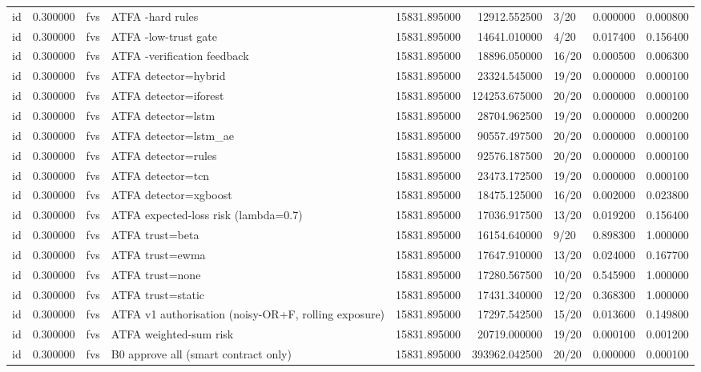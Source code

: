 \begin{tabular}{lrllrrlrr}
id & 0.300000 & fvs & ATFA -hard rules & 15831.895000 & 12912.552500 & 3/20 & 0.000000 & 0.000800 \\
id & 0.300000 & fvs & ATFA -low-trust gate & 15831.895000 & 14641.010000 & 4/20 & 0.017400 & 0.156400 \\
id & 0.300000 & fvs & ATFA -verification feedback & 15831.895000 & 18896.050000 & 16/20 & 0.000500 & 0.006300 \\
id & 0.300000 & fvs & ATFA detector=hybrid & 15831.895000 & 23324.545000 & 19/20 & 0.000000 & 0.000100 \\
id & 0.300000 & fvs & ATFA detector=iforest & 15831.895000 & 124253.675000 & 20/20 & 0.000000 & 0.000100 \\
id & 0.300000 & fvs & ATFA detector=lstm & 15831.895000 & 28704.962500 & 19/20 & 0.000000 & 0.000200 \\
id & 0.300000 & fvs & ATFA detector=lstm\_ae & 15831.895000 & 90557.497500 & 20/20 & 0.000000 & 0.000100 \\
id & 0.300000 & fvs & ATFA detector=rules & 15831.895000 & 92576.187500 & 20/20 & 0.000000 & 0.000100 \\
id & 0.300000 & fvs & ATFA detector=tcn & 15831.895000 & 23473.172500 & 19/20 & 0.000000 & 0.000100 \\
id & 0.300000 & fvs & ATFA detector=xgboost & 15831.895000 & 18475.125000 & 16/20 & 0.002000 & 0.023800 \\
id & 0.300000 & fvs & ATFA expected-loss risk (lambda=0.7) & 15831.895000 & 17036.917500 & 13/20 & 0.019200 & 0.156400 \\
id & 0.300000 & fvs & ATFA trust=beta & 15831.895000 & 16154.640000 & 9/20 & 0.898300 & 1.000000 \\
id & 0.300000 & fvs & ATFA trust=ewma & 15831.895000 & 17647.910000 & 13/20 & 0.024000 & 0.167700 \\
id & 0.300000 & fvs & ATFA trust=none & 15831.895000 & 17280.567500 & 10/20 & 0.545900 & 1.000000 \\
id & 0.300000 & fvs & ATFA trust=static & 15831.895000 & 17431.340000 & 12/20 & 0.368300 & 1.000000 \\
id & 0.300000 & fvs & ATFA v1 authorisation (noisy-OR+F, rolling exposure) & 15831.895000 & 17297.542500 & 15/20 & 0.013600 & 0.149800 \\
id & 0.300000 & fvs & ATFA weighted-sum risk & 15831.895000 & 20719.000000 & 19/20 & 0.000100 & 0.001200 \\
id & 0.300000 & fvs & B0 approve all (smart contract only) & 15831.895000 & 393962.042500 & 20/20 & 0.000000 & 0.000100 \\

\end{tabular}
